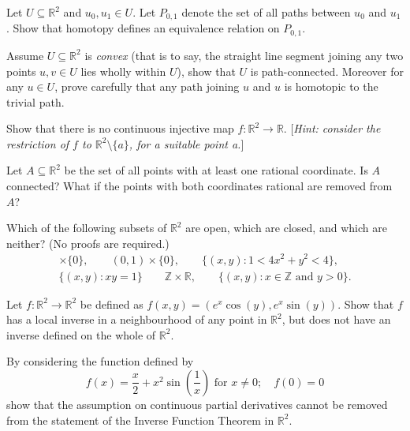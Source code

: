 \documentclass[answers]{exam}
\begin{document}
\begin{questions}
\question%
Let $U \subseteq \mathbb R^2$ and $u_{0}, u_{1} \in U$. Let $P_{0,1}$ denote the set of all paths between $u_{0}$ and $u_{1}$. Show that homotopy defines an equivalence relation on $P_{0,1}$.



\question%
Assume $U \subseteq \mathbb R^2$ is \emph{convex} (that is to say, the straight line segment joining any two points $u, v \in U$ lies wholly within $U$), show that $U$ is path-connected. Moreover for any $u \in U$, prove carefully that any path joining $u$ and $u$ is homotopic to the trivial path.



\question%
Show that there is no continuous injective map $f: \mathbb R^2 \to \mathbb R$. [\emph{Hint: consider the restriction of $f$ to $\mathbb R^2 \setminus\{a\}$, for a suitable point a.}]



\question%
Let $A \subseteq \mathbb R^2$ be the set of all points with at least one rational coordinate. Is $A$ connected? What if the points with both coordinates rational are removed from $A$?



\question%
Which of the following subsets of $\mathbb R^2$ are open, which are closed, and which are neither? (No proofs are required.) \begin{gather*}
	[0,1]\times\{0\},\qquad
	(0,1)\times\{0\},\qquad
	\{(x,y):1<4x^2+y^2<4\},\\
	\{(x, y): x y=1\}\qquad
	\mathbb Z\times\mathbb R,\qquad
	\{(x,y): x \in \mathbb Z \text{ and } y>0\}.
\end{gather*}



\question%
Let $f: \mathbb R^2 \to \mathbb R^2$ be defined as $f(x, y)=(e^{x} \cos (y), e^{x} \sin (y))$. Show that $f$ has a local inverse in a neighbourhood of any point in $\mathbb R^2$, but does not have an inverse defined on the whole of $\mathbb R^2$.



\question%
By considering the function defined by \[
	f(x)=\frac x2+x^2 \sin \left(\frac1x\right)\text{ for }x\neq0;\quad
	f(0)=0
\] show that the assumption on continuous partial derivatives cannot be removed from the statement of the Inverse Function Theorem in $\mathbb R^2$.

\end{questions}
\end{document}
